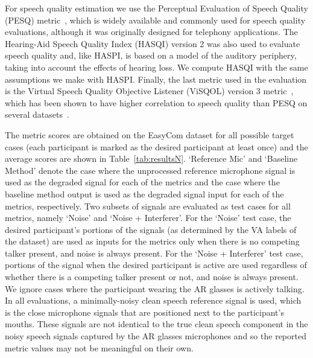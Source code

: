 \documentclass[journal]{IEEEtran}
\begin{document}
For speech quality estimation we use the Perceptual Evaluation of Speech Quality (PESQ) metric~\cite{ITU_PESQ_2003}, which is widely available and commonly used for speech quality evaluations, although it was originally designed for telephony applications.
The Hearing-Aid Speech Quality Index (HASQI) version 2 was also used to evaluate speech quality and, like HASPI, is based on a model of the auditory periphery, taking into account the effects of hearing loss. 
We compute HASQI with the same assumptions we make with HASPI. 
Finally, the last metric used in the evaluation is the Virtual Speech Quality Objective Listener (ViSQOL) version 3 metric~\cite{chinen2020visqol}, which has been shown to have higher correlation to speech quality than PESQ on several datasets~\cite{hines2015visqol}.

The metric scores are obtained on the EasyCom dataset for all possible target cases (each participant is marked as the desired participant at least once) and the average scores are shown in Table~\ref{tab:resultsN}.
`Reference Mic' and `Baseline Method' denote the case where the unprocessed reference microphone signal is used as the degraded signal for each of the metrics and the case where the baseline method output is used as the degraded signal input for each of the metrics, respectively.
Two subsets of signals are evaluated as test cases for all metrics, namely `Noise' and `Noise + Interferer'.
For the `Noise' test case, the desired participant’s portions of the signals (as determined by the VA labels of the dataset) are used as inputs for the metrics only when there is no competing talker present, and noise is always present.
For the `Noise + Interferer' test case, portions of the signal when the desired participant is active are used regardless of whether there is a competing talker present or not, and noise is always present.
We ignore cases where the participant wearing the AR glasses is actively talking.
In all evaluations, a minimally-noisy clean speech reference signal is used, which is the close microphone signals that are positioned next to the participant's mouths. 
These signals are not identical to the true clean speech component in the noisy speech signals captured by the AR glasses microphones and so the reported metric values may not be meaningful on their own.
\end{document}
